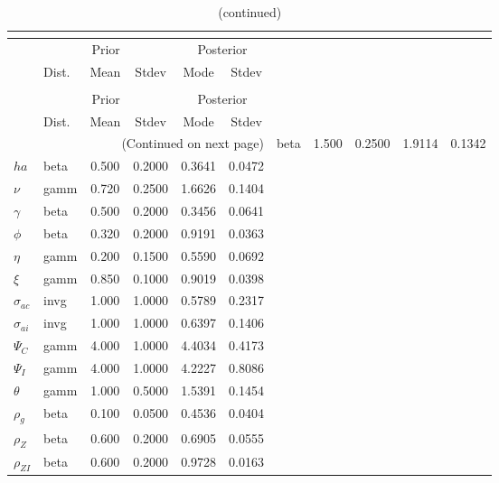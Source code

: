  
\begin{center}
\begin{longtable}{llcccc} 
\caption{Results from posterior maximization (parameters)}\\
 \label{Table:Posterior:1}\\
\toprule 
  & \multicolumn{3}{c}{Prior}  &  \multicolumn{2}{c}{Posterior} \\
  \cmidrule(r{.75em}){2-4} \cmidrule(r{.75em}){5-6}
  & Dist. & Mean  & Stdev & Mode & Stdev \\ 
\midrule \endfirsthead 
\caption{(continued)}\\
 \bottomrule 
  & \multicolumn{3}{c}{Prior}  &  \multicolumn{2}{c}{Posterior} \\
  \cmidrule(r{.75em}){2-4} \cmidrule(r{.75em}){5-6}
  & Dist. & Mean  & Stdev & Mode & Stdev \\ 
\midrule \endhead 
\bottomrule \multicolumn{6}{r}{(Continued on next page)}\endfoot 
\bottomrule\endlastfoot 
${\sigma}$ & beta &   1.500 & 0.2500 &   1.9114 &  0.1342 \\ 
${ha}$ & beta &   0.500 & 0.2000 &   0.3641 &  0.0472 \\ 
$\nu$ & gamm &   0.720 & 0.2500 &   1.6626 &  0.1404 \\ 
$\gamma$ & beta &   0.500 & 0.2000 &   0.3456 &  0.0641 \\ 
${\phi}$ & beta &   0.320 & 0.2000 &   0.9191 &  0.0363 \\ 
${\eta}$ & gamm &   0.200 & 0.1500 &   0.5590 &  0.0692 \\ 
$\xi$ & gamm &   0.850 & 0.1000 &   0.9019 &  0.0398 \\ 
${\sigma_{ac}}$ & invg &   1.000 & 1.0000 &   0.5789 &  0.2317 \\ 
${\sigma_{ai}}$ & invg &   1.000 & 1.0000 &   0.6397 &  0.1406 \\ 
${\Psi_{C}}$ & gamm &   4.000 & 1.0000 &   4.4034 &  0.4173 \\ 
${\Psi_I}$ & gamm &   4.000 & 1.0000 &   4.2227 &  0.8086 \\ 
${\theta}$ & gamm &   1.000 & 0.5000 &   1.5391 &  0.1454 \\ 
${\rho_g}$ & beta &   0.100 & 0.0500 &   0.4536 &  0.0404 \\ 
${\rho_Z}$ & beta &   0.600 & 0.2000 &   0.6905 &  0.0555 \\ 
${\rho_{ZI}}$ & beta &   0.600 & 0.2000 &   0.9728 &  0.0163 \\ 

\end{longtable}
\end{center}
